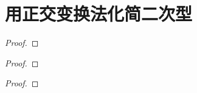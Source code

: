 \documentclass[../../main.tex]{subfiles}%
\begin{document}
\section{用正交变换法化简二次型}

\begin{proposition}\label{proposition:例9.48}

\end{proposition}
\begin{proof}



\end{proof}

\begin{proposition}\label{proposition:例9.49}

\end{proposition}
\begin{proof}



\end{proof}

\begin{proposition}\label{proposition:例9.50}

\end{proposition}
\begin{proof}



\end{proof}
\end{document}

